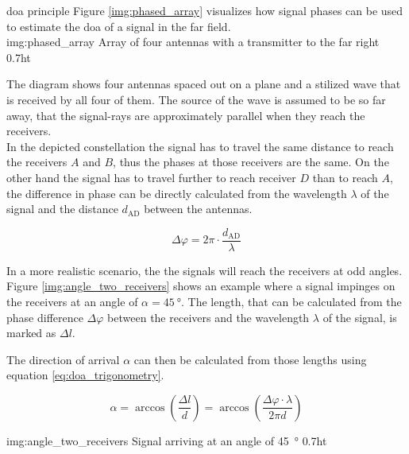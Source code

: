 \begin{subchapter}{\gls{doa} principle}
  Figure \ref{img:phased_array} visualizes how signal phases
  can be used to estimate the \acrlong{doa} of a signal
  in the far field. \\

               {img:phased_array}
               {Array of four antennas with a transmitter to the far right}
               {0.7}{ht}

  The diagram shows four antennas spaced out on a plane
  and a stilized wave that is received by all four of them.
  The source of the wave is assumed to be so far away, that
  the signal-rays are approximately parallel when
  they reach the receivers. \\

  In the depicted constellation the signal has to travel the
  same distance to reach the receivers $A$ and $B$, thus the
  phases at those receivers are the same.
  On the other hand the signal has to travel further to reach
  receiver $D$ than to reach $A$, the difference in phase can
  be directly calculated from the wavelength $\lambda$ of the
  signal and the distance $d_\text{AD}$ between the antennas.

  \begin{equation*}
    \Delta \varphi =  2 \pi \cdot \frac{d_\text{AD}}{\lambda}
  \end{equation*}

  In a more realistic scenario, the the signals will reach the
  receivers at odd angles. Figure \ref{img:angle_two_receivers}
  shows an example where a signal impinges on the receivers at an
  angle of $\alpha=\SI{45}{\degree}$. The length, that can be calculated
  from the phase difference $\Delta \varphi$ between the receivers and
  the wavelength $\lambda$ of the signal, is marked as $\Delta l$.

  The direction of arrival $\alpha$ can then be calculated from
  those lengths using equation \ref{eq:doa_trigonometry}.

  \begin{equation}
    \label{eq:doa_trigonometry}
    \alpha
    = \arccos \left( \frac{\Delta l}{d} \right)
    = \arccos \left( \frac{\Delta \varphi \cdot \lambda}{2 \pi d} \right)
  \end{equation}

               {img:angle_two_receivers}
               {Signal arriving at an angle of \SI{45}{\degree}}
               {0.7}{ht}
\end{subchapter}

